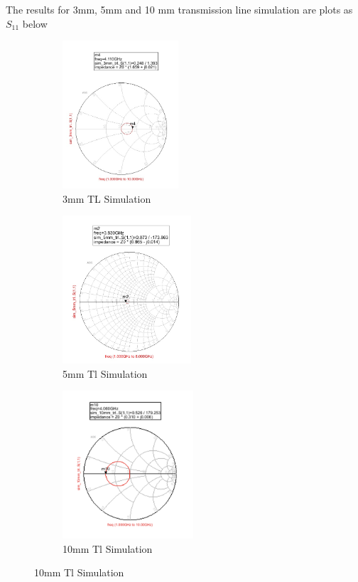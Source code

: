 \documentclass{article}
\begin{document}
The results for 3mm, 5mm and 10 mm transmission line simulation are plots as $S_{11}$ below
\begin{figure}[h]

\begin{subfigure}{0.3\textwidth}
\includegraphics[width=1\linewidth,height = 5.5cm]{figures/tempplot/3mm_sim.jpg} 
\caption{3mm TL Simulation}
\label{fig:subim1}
\end{subfigure}
\begin{subfigure}{0.3\textwidth}
\includegraphics[width=1\linewidth,height = 5.5cm]{figures/tempplot/5mm_sim.jpg}
\caption{5mm Tl Simulation}
\label{fig:subim2}
\end{subfigure}
\begin{subfigure}{0.3\textwidth}
\includegraphics[width=1\linewidth, height = 5.5cm]{figures/tempplot/10mm_sim.png}
\caption{10mm Tl Simulation}
\label{fig:subim3}
\end{subfigure}
\end{figure}
\end{document}
